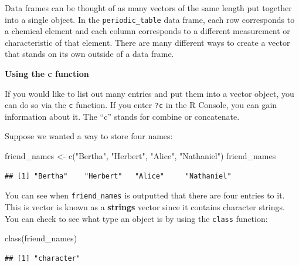 \documentclass[]{tufte-book}
\newenvironment{Shaded}{\begin{snugshade}}{\end{snugshade}}
\newcommand{\FunctionTok}[1]{\textcolor[rgb]{0.00,0.00,0.00}{#1}}
\newcommand{\NormalTok}[1]{#1}
\newcommand{\OtherTok}[1]{\textcolor[rgb]{0.56,0.35,0.01}{#1}}
\newcommand{\StringTok}[1]{\textcolor[rgb]{0.31,0.60,0.02}{#1}}
\begin{document}
Data frames can be thought of as many vectors of the same length put together into a single object. In the \texttt{periodic\_table} data frame, each row corresponds to a chemical element and each column corresponds to a different measurement or characteristic of that element. There are many different ways to create a vector that stands on its own outside of a data frame. \newline\vspace*{0.1in}

\vspace*{0.2in}

\noindent\textbf{Using the c function}\vspace*{0.1in}

If you would like to list out many entries and put them into a vector object, you can do so via the \texttt{c} function. If you enter \texttt{?c} in the R Console, you can gain information about it. The ``c'' stands for combine or concatenate.

Suppose we wanted a way to store four names:

\begin{Shaded}
\begin{Highlighting}[]
\NormalTok{friend\_names }\OtherTok{\textless{}{-}} \FunctionTok{c}\NormalTok{(}\StringTok{"Bertha"}\NormalTok{, }\StringTok{"Herbert"}\NormalTok{, }\StringTok{"Alice"}\NormalTok{, }\StringTok{"Nathaniel"}\NormalTok{)}
\NormalTok{friend\_names}
\end{Highlighting}
\end{Shaded}

\begin{verbatim}
## [1] "Bertha"    "Herbert"   "Alice"     "Nathaniel"
\end{verbatim}

You can see when \texttt{friend\_names} is outputted that there are four entries to it. This is vector is known as a \textbf{strings} vector since it contains character strings. You can check to see what type an object is by using the \texttt{class} function:

\begin{Shaded}
\begin{Highlighting}[]
\FunctionTok{class}\NormalTok{(friend\_names)}
\end{Highlighting}
\end{Shaded}

\begin{verbatim}
## [1] "character"
\end{verbatim}
\end{document}

